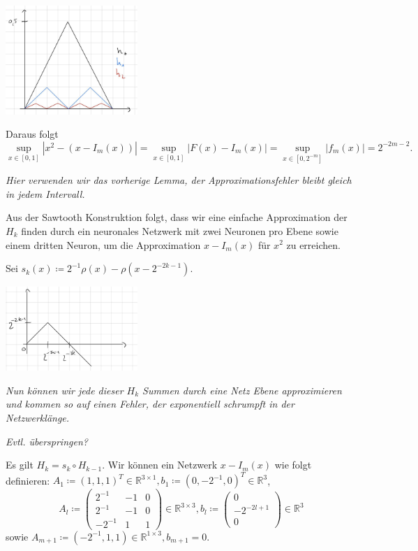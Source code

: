 \documentclass[12pt]{article}
\newcommand{\R}{\mathbb{R}} %
\begin{document}
\begin{center}
    \includegraphics[width=5cm]{images/iii2_3.jpg} %
\end{center}

Daraus folgt 
\[ \sup_{x\in [0,1]} |x^2 - (x - I_m(x)) | = \sup_{x\in [0,1]} |F(x) - I_m(x) | = \sup_{x\in [0, 2^{-m}]} |f_m(x)| = 2^{-2m-2}. \]

\textit{Hier verwenden wir das vorherige Lemma, 
der Approximationsfehler bleibt gleich in jedem Intervall.}

Aus der Sawtooth Konstruktion folgt, dass wir eine einfache Approximation der \(H_k\) finden 
durch ein neuronales Netzwerk mit zwei Neuronen pro Ebene 
sowie einem dritten Neuron, um die Approximation \(x - I_m(x)\) für \(x^2\) zu erreichen.

Sei \(s_k(x) \coloneqq 2^{-1}\rho(x) - \rho(x - 2^{-2k-1})\).
\begin{center}
    \includegraphics[width=5cm]{images/iii2_4.jpg} %
\end{center}

\textit{Nun können wir jede dieser \(H_k\) Summen durch eine Netz Ebene approximieren 
und kommen so auf einen Fehler, der exponentiell schrumpft in der Netzwerklänge.}

\textit{Evtl. überspringen?}

Es gilt \(H_k = s_k \circ H_{k-1}\). Wir können ein Netzwerk \(x - I_m(x)\) wie folgt definieren: 
\(A_1 \coloneqq (1, 1, 1)^T \in \R^{3\times 1}, b_1 \coloneqq (0, -2^{-1}, 0)^T \in \R^3 \),
\[ A_l \coloneqq \begin{pmatrix}
    2^{-1} & -1 & 0 \\ 2^{-1} & -1 & 0 \\ -2^{-1} & 1 & 1
\end{pmatrix} \in \R^{3 \times 3}, b_l \coloneqq \begin{pmatrix}
    0 \\ -2^{-2l + 1} \\ 0
\end{pmatrix} \in \R^3 \]
sowie 
\(A_{m+1} \coloneqq (-2^{-1}, 1, 1) \in \R^{1 \times 3}, b_{m+1} = 0\).
\end{document}
